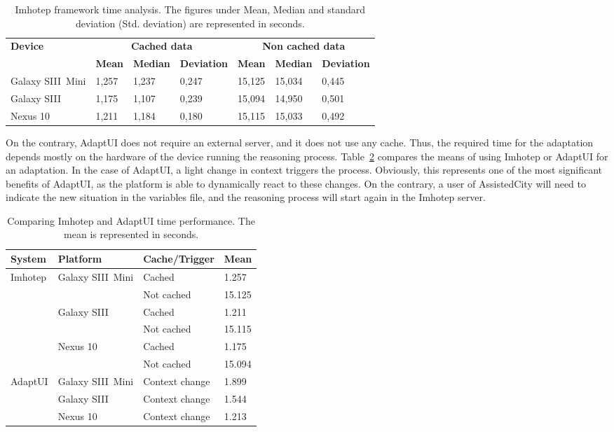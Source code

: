 \begin{table}[H]
 \caption{Imhotep framework time analysis. The figures under Mean, Median and
 standard deviation (Std. deviation) are represented in seconds.}
 \label{tbl:imhotep_timing}
 \footnotesize
 \centering
\begin{tabular}{l l l l l l l}
  \hline 
  \textbf{Device} & \multicolumn{3}{c}{\textbf{Cached 
  data}} & \multicolumn{3}{c}{\textbf{Non cached data}}\\
  & \textbf{Mean} & \textbf{Median} & \textbf{Deviation} &  \textbf{Mean} 
  & \textbf{Median} & \textbf{Deviation}\\
  \hline    
  Galaxy SIII~Mini & 1,257 & 1,237 & 0,247 & 15,125 & 15,034 & 0,445\\
%   
  Galaxy SIII & 1,175 & 1,107 & 0,239 & 15,094 & 14,950 & 0,501 	\\
%   
  Nexus 10 & 1,211 & 1,184 & 0,180 & 15,115 & 15,033 & 0,492 	\\
 \hline
\end{tabular}
\end{table}

On the contrary, AdaptUI does not require an external server, and it does not 
use any cache. Thus, the required time for the adaptation depends mostly on the 
hardware of the device running the reasoning process. Table~\ref{tbl:imhotep_vs_adaptui}
compares the means of using Imhotep or AdaptUI for an adaptation. In the case of 
AdaptUI, a light change in context triggers the process. Obviously, this represents
one of the most significant benefits of AdaptUI, as the platform is able to 
dynamically react to these changes. On the contrary, a user of AssistedCity will
need to indicate the new situation in the variables file, and the reasoning process
will start again in the Imhotep server.

\begin{table}[H]
 \caption{Comparing Imhotep and AdaptUI time performance. The mean is 
represented in seconds.}
 \label{tbl:imhotep_vs_adaptui}
 \footnotesize
 \centering
\begin{tabular}{l l l l}
  \hline 
  \textbf{System} & \textbf{Platform} & \textbf{Cache/Trigger} & \textbf{Mean}\\
  \hline
  Imhotep 	& Galaxy SIII~Mini	& Cached		& 1.257\\
		&  			& Not cached		& 15.125\\
		& Galaxy SIII 		& Cached		& 1.211\\
		&  			& Not cached		& 15.115\\
		& Nexus 10 		& Cached		& 1.175\\
		&  			& Not cached		& 15.094\\
  \hline
  AdaptUI 	& Galaxy SIII~Mini	& Context change	& 1.899\\
		& Galaxy SIII		& Context change	& 1.544\\
 		& Nexus 10 		& Context change	& 1.213\\
  \hline
\end{tabular}
\end{table}

